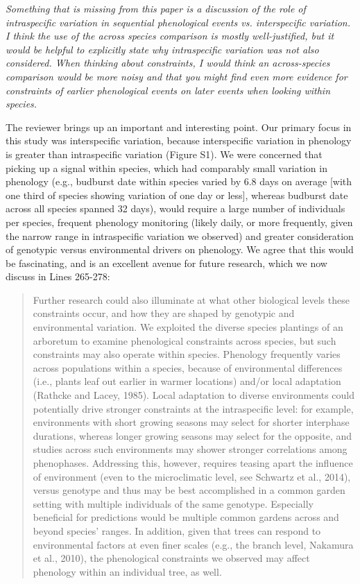 \documentclass[10.95pt,a4paper]{letter}
\begin{document}
\par \emph{Something that is missing from this paper is a discussion of the role of intraspecific variation in sequential phenological events vs. interspecific variation.  I think the use of the across species comparison is mostly well-justified, but it would be helpful to explicitly state why intraspecific variation was not also considered.  When thinking about constraints, I would think an across-species comparison would be more noisy and that you might find even more evidence for constraints of earlier phenological events on later events when looking within species.}
\par The reviewer brings up an important and interesting point. Our primary focus in this study was interspecific variation, because interspecific variation in phenology is greater than intraspecific variation (Figure S1). We were concerned that picking up a signal within species, which had comparably small variation in phenology (e.g., budburst date within species varied by 6.8 days on average [with one third of species showing variation of one day or less], whereas budburst date across all species spanned 32 days), would require a large number of individuals per species, frequent phenology monitoring (likely daily, or more frequently, given the narrow range in intraspecific variation we observed) and greater consideration of genotypic versus environmental drivers on phenology. We agree that this would be fascinating, and is an excellent avenue for future research, which we now discuss in Lines 265-278:

\begin{quote}
Further research could also illuminate at what other biological levels these constraints occur, and how they are shaped by genotypic and environmental variation. We exploited the diverse species plantings of an arboretum to examine phenological constraints across species, but such constraints may also operate within species. Phenology frequently varies across populations within a species, because of environmental differences (i.e., plants leaf out earlier in warmer locations) and/or local adaptation (Rathcke and Lacey, 1985). Local adaptation to diverse environments could potentially drive stronger constraints at the intraspecific level: for example, environments with short growing seasons may select for shorter interphase durations, whereas longer growing seasons may select for the opposite, and studies across such environments may shower stronger correlations among phenophases. Addressing this, however, requires teasing apart the influence of environment (even to the microclimatic level, see Schwartz et al., 2014), versus genotype and thus may be best accomplished in a common garden setting with multiple individuals of the same genotype. Especially beneficial for predictions would be multiple common gardens across and beyond species' ranges. In addition, given that trees can respond to environmental factors at even finer scales (e.g., the branch level, Nakamura et al., 2010), the phenological constraints we observed may affect phenology within an individual tree, as well.
\end{quote}
\end{document}
